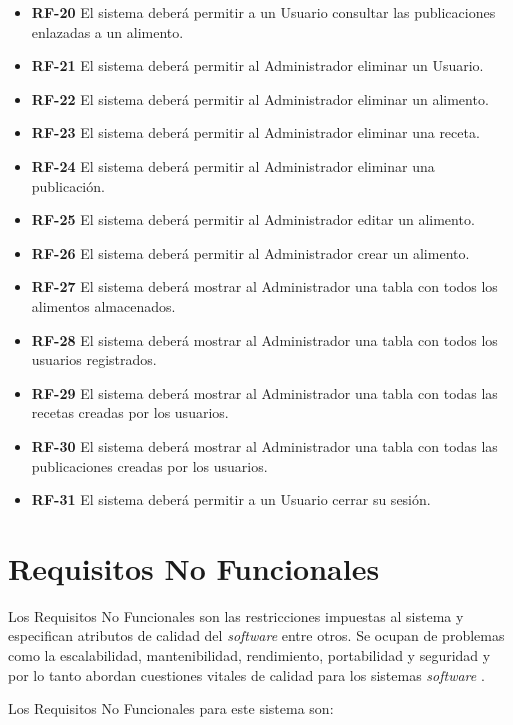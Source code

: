 \begin{itemize}
 \item \textbf{RF-20} El sistema deberá permitir a un Usuario consultar las publicaciones enlazadas a un alimento.
  \item \textbf{RF-21} El sistema deberá permitir al Administrador eliminar un Usuario.
  \item \textbf{RF-22} El sistema deberá permitir al Administrador eliminar un alimento.
  \item \textbf{RF-23} El sistema deberá permitir al Administrador eliminar una receta.
  \item \textbf{RF-24} El sistema deberá permitir al Administrador eliminar una publicación.
  \item \textbf{RF-25} El sistema deberá permitir al Administrador editar un alimento.
  \item \textbf{RF-26} El sistema deberá permitir al Administrador crear un alimento.
   \item \textbf{RF-27} El sistema deberá mostrar al Administrador una tabla con todos los alimentos almacenados.
   \item \textbf{RF-28} El sistema deberá mostrar al Administrador una tabla con todos los usuarios registrados.
   \item \textbf{RF-29} El sistema deberá mostrar al Administrador una tabla con todas las recetas creadas por los usuarios.
   \item \textbf{RF-30} El sistema deberá mostrar al Administrador una tabla con todas las publicaciones creadas por los usuarios.
   \item \textbf{RF-31} El sistema deberá permitir a un Usuario cerrar su sesión.

\end{itemize}

\section{Requisitos No Funcionales}

Los Requisitos No Funcionales son las restricciones impuestas al sistema y especifican atributos de calidad del \textit{software} entre otros. Se ocupan de problemas como la escalabilidad, mantenibilidad, rendimiento, portabilidad y seguridad y por lo tanto abordan cuestiones vitales de calidad para los sistemas \textit{software} \cite{requisitos}.

Los Requisitos No Funcionales para este sistema son: 

